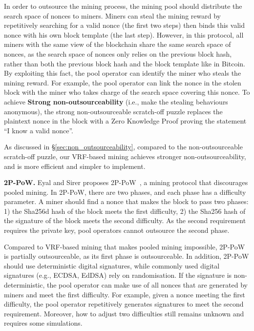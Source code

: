 In order to outsource the mining process, the mining pool should distribute the search space of nonces to miners.
Miners can steal the mining reward by repetitively searching for a valid nonce (the first two steps) then binds this valid nonce with his own block template (the last step).
However, in this protocol, all miners with the same view of the blockchain share the same search space of nonces, as the search space of nonces only relies on the previous block hash, rather than both the previous block hash and the block template like in Bitcoin.
By exploiting this fact, the pool operator can identify the miner who steals the mining reward.
For example, the pool operator can link the nonce in the stolen block with the miner who takes charge of the search space covering this nonce.
To achieve \textbf{Strong non-outsourceability} (i.e., make the stealing behaviours anonymous), the strong non-outsourceable scratch-off puzzle replaces the plaintext nonce in the block with a Zero Knowledge Proof proving the statement ``I know a valid nonce''.

As discussed in \S\ref{sec:non_outsourceability}, compared to the non-outsourceable scratch-off puzzle, our VRF-based mining achieves stronger non-outsourceability, and is more efficient and simpler to implement.

\textbf{2P-PoW.}
Eyal and Sirer proposes 2P-PoW~\cite{2P-PoW}, a mining protocol that discourages pooled mining.
In 2P-PoW, there are two phases, and each phase has a difficulty parameter.
A miner should find a nonce that makes the block to pass two phases: 1) the Sha256d hash of the block meets the first difficulty, 2) the Sha256 hash of the signature of the block meets the second difficulty.
As the second requirement requires the private key, pool operators cannot outsource the second phase.

Compared to VRF-based mining that makes pooled mining impossible, 2P-PoW is partially outsourceable, as its first phase is outsourceable.
In addition, 2P-PoW should use deterministic digital signatures, while commonly used digital signatures (e.g., ECDSA, EdDSA) rely on randomisation.
If the signature is non-deterministic, the pool operator can make use of all nonces that are generated by miners and meet the first difficulty.
For example, given a nonce meeting the first difficulty, the pool operator repetitively generates signatures to meet the second requirement.
Moreover, how to adjust two difficulties still remains unknown and requires some simulations.




